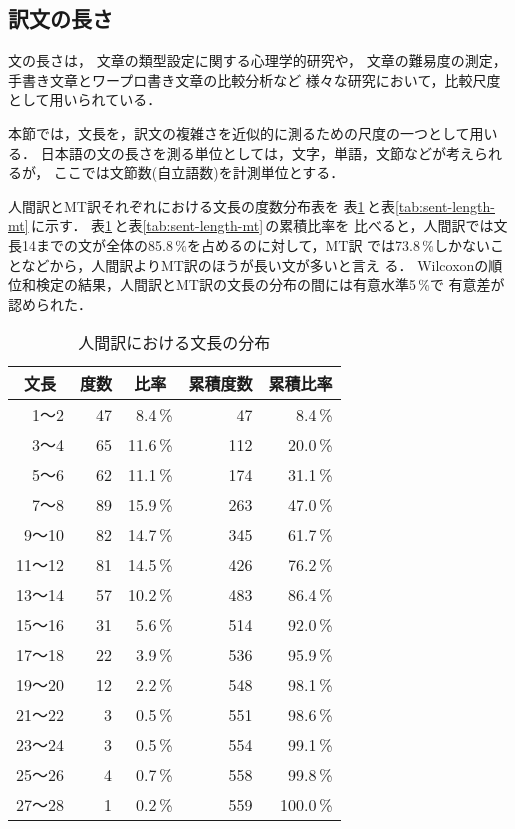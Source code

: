 \subsection{訳文の長さ}
\label{sec:result:sent-len}

文の長さは，
文章の類型設定に関する心理学的研究\cite{Hatano65}や，
文章の難易度の測定\cite{Morioka88}， 
手書き文章とワープロ書き文章の比較分析\cite{Jim93}など
様々な研究において，比較尺度として用いられている．

本節では，文長を，訳文の複雑さを近似的に測るための尺度の一つとして用いる．
日本語の文の長さを測る単位としては，文字，単語，文節などが考えられるが，
ここでは文節数(自立語数)を計測単位とする．

人間訳とMT訳それぞれにおける文長の度数分布表を
表\ref{tab:sent-length-hum}\,と表\ref{tab:sent-length-mt}\,に示す．
表\ref{tab:sent-length-hum}\,と表\ref{tab:sent-length-mt}\,の累積比率を
比べると，人間訳では文長14までの文が全体の85.8\,\%を占めるのに対して，MT訳
では73.8\,\%しかないことなどから，人間訳よりMT訳のほうが長い文が多いと言え
る．
Wilcoxonの順位和検定の結果，人間訳とMT訳の文長の分布の間には有意水準5\,\%で
有意差が認められた．
\begin{table}[htbp]
\caption{人間訳における文長の分布}
\label{tab:sent-length-hum}
\begin{center}
\begin{tabular}{|r||r|r|r|r|}\hline
\multicolumn{1}{|c||}{文長} & \multicolumn{1}{c|}{度数} & 
\multicolumn{1}{c|}{比率} & \multicolumn{1}{c|}{累積度数} & 
\multicolumn{1}{c|}{累積比率} \\\hline\hline
   1〜2 & 47 &  8.4\,\% &  47 &  8.4\,\% \\
   3〜4 & 65 & 11.6\,\% & 112 & 20.0\,\% \\
   5〜6 & 62 & 11.1\,\% & 174 & 31.1\,\% \\
   7〜8 & 89 & 15.9\,\% & 263 & 47.0\,\% \\
  9〜10 & 82 & 14.7\,\% & 345 & 61.7\,\% \\
 11〜12 & 81 & 14.5\,\% & 426 & 76.2\,\% \\
 13〜14 & 57 & 10.2\,\% & 483 & 86.4\,\% \\
 15〜16 & 31 &  5.6\,\% & 514 & 92.0\,\% \\
 17〜18 & 22 &  3.9\,\% & 536 & 95.9\,\% \\
 19〜20 & 12 &  2.2\,\% & 548 & 98.1\,\% \\
 21〜22 &  3 &  0.5\,\% & 551 & 98.6\,\% \\
 23〜24 &  3 &  0.5\,\% & 554 & 99.1\,\% \\
 25〜26 &  4 &  0.7\,\% & 558 & 99.8\,\% \\
 27〜28 &  1 &  0.2\,\% & 559 & 100.0\,\% \\\hline
\hline
\end{tabular}
\end{center}
\end{table}
